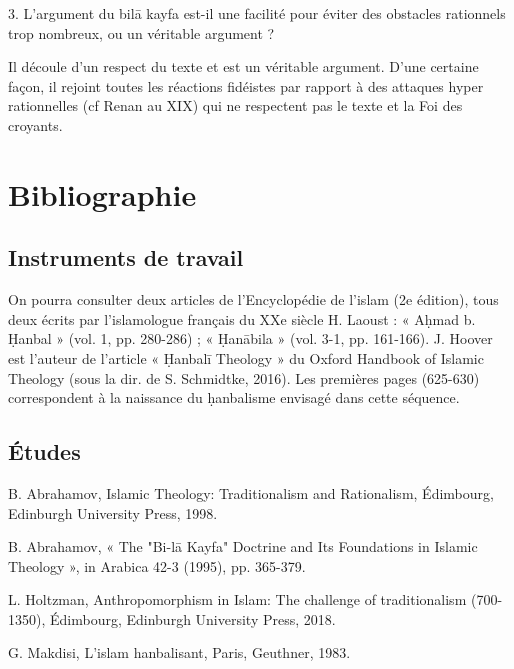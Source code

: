   3. L’argument du bilā kayfa est-il une facilité pour éviter des obstacles rationnels trop nombreux, ou un véritable argument ? 
   \begin{Synthesis}
  Il découle d'un respect du texte et est un véritable argument. D'une certaine façon, il rejoint toutes les réactions fidéistes par rapport à des attaques hyper rationnelles (cf Renan au XIX) qui ne respectent pas le texte et la Foi des croyants.
  
  \end{Synthesis}


\section{Bibliographie}
\subsection{Instruments de travail}
On pourra consulter deux articles de l’Encyclopédie de l’islam (2e édition), tous deux écrits par l’islamologue français du XXe siècle H. Laoust : « Aḥmad b. Ḥanbal » (vol. 1, pp. 280-286) ; « Ḥanābila » (vol. 3-1, pp. 161-166). J. Hoover est l’auteur de l’article « Ḥanbalī Theology » du Oxford Handbook of Islamic Theology (sous la dir. de S. Schmidtke, 2016). Les premières pages (625-630) correspondent à la naissance du ḥanbalisme envisagé dans cette séquence.  

\subsection{Études}
 B. Abrahamov, Islamic Theology: Traditionalism and Rationalism, Édimbourg, Edinburgh University Press, 1998. 
 
 B. Abrahamov, « The "Bi-lā Kayfa" Doctrine and Its Foundations in Islamic Theology », in Arabica 42-3 (1995), pp. 365-379. 
 
 
 L. Holtzman, Anthropomorphism in Islam: The challenge of traditionalism (700-1350), Édimbourg, Edinburgh University Press, 2018. 
 
 G. Makdisi, L’islam hanbalisant, Paris, Geuthner, 1983. 